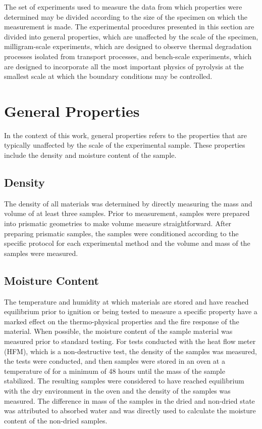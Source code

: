 \documentclass[12pt,oneside]{book}
\begin{document}
The set of experiments used to measure the data from which properties were determined may be divided according to the size of the specimen on which the measurement is made. The experimental procedures presented in this section are divided into general properties, which are unaffected by the scale of the specimen, milligram-scale experiments, which are designed to observe thermal degradation processes isolated from transport processes, and bench-scale experiments, which are designed to incorporate all the most important physics of pyrolysis at the smallest scale at which the boundary conditions may be controlled.

\section{General Properties}
\label{sec:general_properties}

In the context of this work, general properties refers to the properties that are typically unaffected by the scale of the experimental sample. These properties include the density and moisture content of the sample.

\subsection{Density}
\label{sec:density}

The density of all materials was determined by directly measuring the mass and volume of at least three samples. Prior to measurement, samples were prepared into prismatic geometries to make volume measure straightforward. After preparing prismatic samples, the samples were conditioned according to the specific protocol for each experimental method and the volume and mass of the samples were measured.  

\subsection{Moisture Content}
\label{sec:moisture_content}

The temperature and humidity at which materials are stored and have reached equilibrium prior to ignition or being tested to measure a specific property have a marked effect on the thermo-physical properties and the fire response of the material. When possible, the moisture content of the sample material was measured prior to standard testing. For tests conducted with the heat flow meter (HFM), which is a non-destructive test, the density of the samples was measured, the tests were conducted, and then samples were stored in an oven at a temperature of  for a minimum of 48 hours until the mass of the sample stabilized. The resulting samples were considered to have reached equilibrium with the dry environment in the oven and the density of the samples was measured. The difference in mass of the samples in the dried and non-dried state was attributed to absorbed water and was directly used to calculate the moisture content of the non-dried samples.
\end{document}
